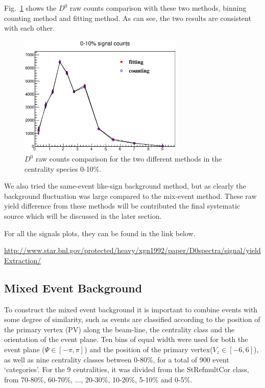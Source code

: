 Fig.~\ref{fig:0_10_signal_comapre} shows the $D^{0}$ raw counts comparison with these two methods, binning counting method and fitting method. As can see, the two results are consistent with each other.

\begin{figure}[htbp]
\centering
\includegraphics[keepaspectratio,width=0.7\textwidth]{figure/Run14_D0HFT/0_10_signal_comapreMethod.eps}
\caption{$D^0$ raw counts comparison for the two different methods in the centrality species 0-10\%.}
\label{fig:0_10_signal_comapre}
\end{figure}

We also tried the same-event like-sign background method, but as clearly the background fluctuation was large compared to the mix-event method. These raw yield difference from these methods will be contributed the final systematic source which will be discussed in the later section.

For all the signals plots, they can be found in the link below.

\url{http://www.star.bnl.gov/protected/heavy/xgn1992/paper/D0spectra/signal/yieldExtraction/}


\subsection{Mixed Event Background}

To construct the mixed event background it is important to combine events with some degree of similarity, such as events are classified according to the position of the primary vertex (PV) along the beam-line, the centrality class and the orientation of the event plane. Ten bins of equal width were used for both the event plane ($\Psi\in[-\pi,\pi]$) and the position of the primary vertex($V_z\in[-6,6]$), as well as nine centrality classes between 0-80\%, for a total of 900 event `categories'. For the 9 centralities, it was divided from the StRefmultCor class, from 70-80\%, 60-70\%, ..., 20-30\%, 10-20\%, 5-10\% and 0-5\%.

